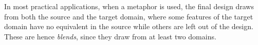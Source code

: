 \begin{remark}[Blend] \label{rem:blend} 
  In most practical applications, when a metaphor is used, the final design draws from both the source and the target domain, where some features of the target domain have no equivalent in the source while others are left out of the design. These are hence \emph{blends}, since they draw from at least two domains. \cite[p. 194]{benyon14}
\end{remark}